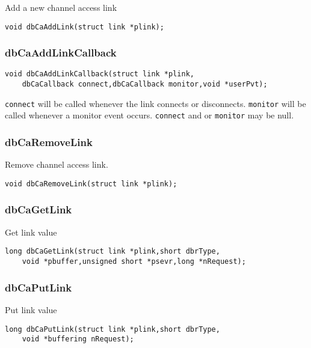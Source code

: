 Add a new channel access link

\begin{verbatim}
void dbCaAddLink(struct link *plink);
\end{verbatim}

\subsubsection{dbCaAddLinkCallback}

\begin{verbatim}
void dbCaAddLinkCallback(struct link *plink,
    dbCaCallback connect,dbCaCallback monitor,void *userPvt);
\end{verbatim}

\verb|connect| will be called whenever the link connects or disconnects.
\verb|monitor| will be called whenever a monitor event occurs.
\verb|connect| and or \verb|monitor| may be null.

\subsubsection{dbCaRemoveLink}

Remove channel access link.

\begin{verbatim}
void dbCaRemoveLink(struct link *plink);
\end{verbatim}

\subsubsection{dbCaGetLink}

Get link value

\begin{verbatim}
long dbCaGetLink(struct link *plink,short dbrType,
    void *pbuffer,unsigned short *psevr,long *nRequest);
\end{verbatim}

\subsubsection{dbCaPutLink}

Put link value

\begin{verbatim}
long dbCaPutLink(struct link *plink,short dbrType,
    void *buffering nRequest);
\end{verbatim}

